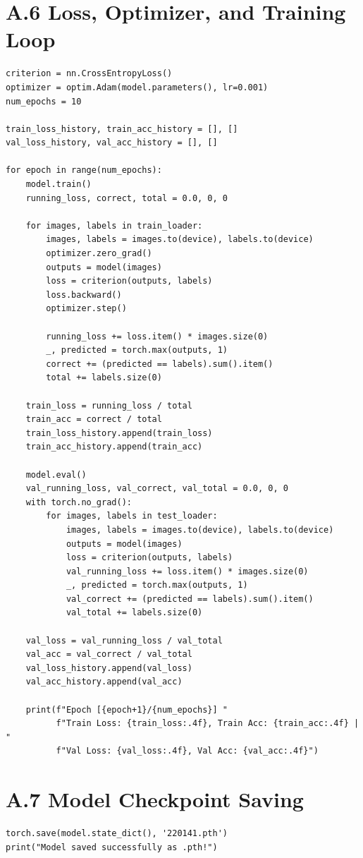 \documentclass[12pt,a4paper]{report}
\begin{document}
\section*{A.6 Loss, Optimizer, and Training Loop}
\begin{lstlisting}
criterion = nn.CrossEntropyLoss()
optimizer = optim.Adam(model.parameters(), lr=0.001)
num_epochs = 10

train_loss_history, train_acc_history = [], []
val_loss_history, val_acc_history = [], []

for epoch in range(num_epochs):
    model.train()
    running_loss, correct, total = 0.0, 0, 0

    for images, labels in train_loader:
        images, labels = images.to(device), labels.to(device)
        optimizer.zero_grad()
        outputs = model(images)
        loss = criterion(outputs, labels)
        loss.backward()
        optimizer.step()

        running_loss += loss.item() * images.size(0)
        _, predicted = torch.max(outputs, 1)
        correct += (predicted == labels).sum().item()
        total += labels.size(0)

    train_loss = running_loss / total
    train_acc = correct / total
    train_loss_history.append(train_loss)
    train_acc_history.append(train_acc)

    model.eval()
    val_running_loss, val_correct, val_total = 0.0, 0, 0
    with torch.no_grad():
        for images, labels in test_loader:
            images, labels = images.to(device), labels.to(device)
            outputs = model(images)
            loss = criterion(outputs, labels)
            val_running_loss += loss.item() * images.size(0)
            _, predicted = torch.max(outputs, 1)
            val_correct += (predicted == labels).sum().item()
            val_total += labels.size(0)

    val_loss = val_running_loss / val_total
    val_acc = val_correct / val_total
    val_loss_history.append(val_loss)
    val_acc_history.append(val_acc)

    print(f"Epoch [{epoch+1}/{num_epochs}] "
          f"Train Loss: {train_loss:.4f}, Train Acc: {train_acc:.4f} | "
          f"Val Loss: {val_loss:.4f}, Val Acc: {val_acc:.4f}")
\end{lstlisting}

\section*{A.7 Model Checkpoint Saving}
\begin{lstlisting}
torch.save(model.state_dict(), '220141.pth')
print("Model saved successfully as .pth!")
\end{lstlisting}
\end{document}
